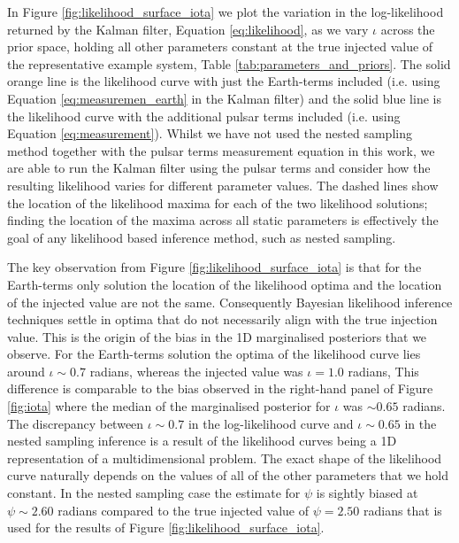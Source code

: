 \documentclass[fleqn,usenatbib,useAMS]{mnras}
\begin{document}
In Figure \ref{fig:likelihood_surface_iota} we plot the variation in the log-likelihood returned by the Kalman filter, Equation \eqref{eq:likelihood}, as we vary $\iota$ across the prior space, holding all other parameters constant at the true injected value of the representative example system, Table \ref{tab:parameters_and_priors}. The solid orange line is the likelihood curve with just the Earth-terms included (i.e. using Equation \ref{eq:measuremen_earth} in the Kalman filter) and the solid blue line is the likelihood curve with the additional pulsar terms included (i.e. using Equation \ref{eq:measurement}). Whilst we have not used the nested sampling method together with the pulsar terms measurement equation in this work, we are able to run the Kalman filter using the pulsar terms and consider how the resulting likelihood varies for different parameter values. The dashed lines show the location of the likelihood maxima for each of the two likelihood solutions; finding the location of the maxima across all static parameters is effectively the goal of any likelihood based inference method, such as nested sampling. \newline  

The key observation from Figure \ref{fig:likelihood_surface_iota} is that for the Earth-terms only solution the location of the likelihood optima and the location of the injected value are not the same. Consequently Bayesian likelihood inference techniques settle in optima that do not necessarily align with the true injection value. This is the origin of the bias in the 1D marginalised posteriors that we observe.  For the Earth-terms solution the optima of the likelihood curve lies around $\iota \sim 0.7$ radians, whereas the injected value was $\iota = 1.0$ radians, This difference is comparable to the bias observed in the right-hand panel of Figure \ref{fig:iota} where the median of the marginalised posterior for $\iota$ was $\sim 0.65$ radians. The discrepancy between $\iota \sim 0.7$ in the log-likelihood curve and $\iota \sim 0.65$ in the nested sampling inference is a result of the likelihood curves being a 1D representation of a multidimensional problem. The exact shape of the likelihood curve naturally depends on the values of all of the other parameters that we hold constant. In the nested sampling case the estimate for $\psi$ is sightly biased at $\psi \sim 2.60$ radians compared to the true injected value of $\psi = 2.50$ radians that is used for the results of Figure \ref{fig:likelihood_surface_iota}. \newline 
\end{document}
